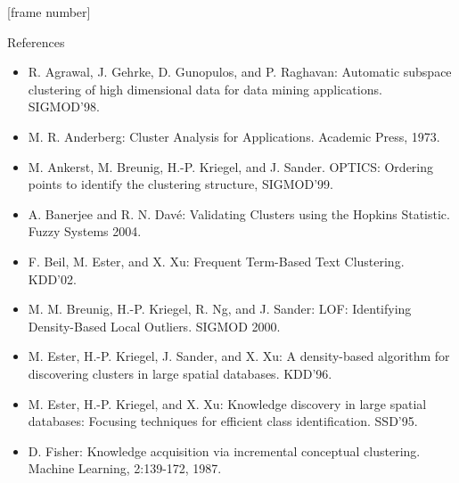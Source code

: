 \documentclass[aspectratio=169,t,xcolor=dvipsnames]{beamer}
\begin{document}
  {
    [frame number]
    \begin{frame}{References}
        \begin{itemize}
          \item R. Agrawal, J. Gehrke, D. Gunopulos, and P. Raghavan: Automatic subspace clustering of high dimensional data for data mining applications. SIGMOD'98.
          \item M. R. Anderberg: Cluster Analysis for Applications. Academic Press, 1973.
          \item M. Ankerst, M. Breunig, H.-P. Kriegel, and J. Sander. OPTICS: Ordering points to identify the clustering structure, SIGMOD'99.
          \item A. Banerjee and R. N. Davé: Validating Clusters using the Hopkins Statistic. Fuzzy Systems 2004.
          \item F. Beil, M. Ester, and X. Xu: Frequent Term-Based Text Clustering. KDD'02.
          \item M. M. Breunig, H.-P. Kriegel, R. Ng, and J. Sander: LOF: Identifying Density-Based Local Outliers. SIGMOD 2000.
          \item M. Ester, H.-P. Kriegel, J. Sander, and X. Xu: A density-based algorithm for discovering clusters in large spatial databases. KDD'96.
          \item M. Ester, H.-P. Kriegel, and X. Xu: Knowledge discovery in large spatial databases: Focusing techniques for efficient class identification. SSD'95.
          \item D. Fisher: Knowledge acquisition via incremental conceptual clustering. Machine Learning, 2:139-172, 1987.
        \end{itemize}
    \end{frame}
  }
\end{document}
